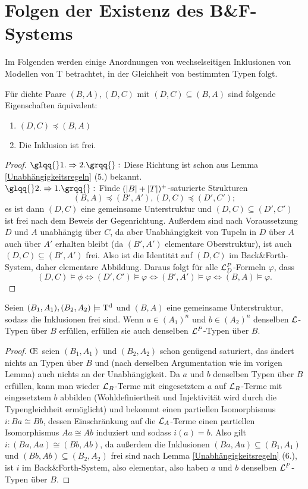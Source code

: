 \section{Folgen der Existenz des B\&F-Systems}
Im Folgenden werden einige Anordnungen von wechselseitigen Inklusionen von Modellen von T betrachtet, in der Gleichheit von bestimmten Typen folgt.

\begin{lemma}\label{freie Inklusionen}
	Für dichte Paare $(B,A),(D,C)$ mit $(D,C)\subseteq(B,A)$ sind folgende Eigenschaften äquivalent:
	\begin{enumerate}
		\item $(D,C)\preceq(B,A)$
		\item Die Inklusion ist frei.
	\end{enumerate}
\end{lemma}
\begin{proof}
	$\glqq{}1.\Rightarrow2.\grqq{}:$ Diese Richtung ist schon aus Lemma \ref{Unabhängigkeitsregeln} (5.) bekannt.\\
	$\glqq{}2.\Rightarrow1.\grqq{}:$ Finde $({\left| B \right|}+{\left| T \right|})^+$-saturierte Strukturen $$(B,A)\preceq(B',A'),(D,C)\preceq(D',C');$$ es ist dann $(D,C)$ eine gemeinsame Unterstruktur und $(D,C)\subseteq(D',C')$ ist frei nach dem Beweis der Gegenrichtung. Außerdem sind nach Voraussetzung $D$ und $A$ unabhängig über $C$, da aber Unabhängigkeit von Tupeln in $D$ über $A$ auch über $A'$ erhalten bleibt (da $(B',A')$ elementare Oberstruktur), ist auch $(D,C)\subseteq(B',A')$ frei. Also ist die Identität auf $(D,C)$ im Back\&Forth-System, daher elementare Abbildung. Daraus folgt für alle $\mathcal{L}^P_D$-Formeln $\varphi$, dass $$(D,C)\models\phi\Leftrightarrow(D',C')\models\varphi\Leftrightarrow(B',A')\models\varphi\Leftrightarrow(B,A)\models\varphi.$$
\end{proof}

\begin{lemma}\label{Gemeinsame Unterstruktur}
	Seien $(B_1,A_1),(B_2,A_2)\models\operatorname{T^d}$ und $(B,A)$ eine gemeinsame Unterstruktur, sodass die Inklusionen frei sind. Wenn $a\in (A_1)^n$ und $b\in (A_2)^n$ denselben $\mathcal{L}$-Typen über $B$ erfüllen, erfüllen sie auch denselben $\mathcal{L}^P$-Typen über $B$.
\end{lemma}
\begin{proof}
	\OE\ seien $(B_1,A_1)$ und $(B_2,A_2)$ schon genügend saturiert, das ändert nichts an Typen über $B$ und (nach derselben Argumentation wie im vorigen Lemma) auch nichts an der Unabhängigkeit. Da $a$ und $b$ denselben Typen über $B$ erfüllen, kann man wieder $\mathcal{L}_B$-Terme mit eingesetztem $a$ auf $\mathcal{L}_B$-Terme mit eingesetztem $b$ abbilden (Wohldefiniertheit und Injektivität wird durch die Typengleichheit ermöglicht) und bekommt einen partiellen Isomorphismus $i:Ba\cong Bb$, dessen Einschränkung auf die $\mathcal{L}_A$-Terme einen partiellen Isomorphismus $Aa\cong Ab$ induziert und sodass $i(a)=b$. Also gilt $i:(Ba,Aa)\cong(Bb,Ab)$, da außerdem die Inklusionen $(Ba,Aa)\subseteq(B_1,A_1)$ und $(Bb,Ab)\subseteq(B_2,A_2)$ frei sind nach Lemma \ref{Unabhängigkeitsregeln} (6.), ist $i$ im Back\&Forth-System, also elementar, also haben $a$ und $b$ denselben $\mathcal{L}^P$-Typen über $B$.
\end{proof}

